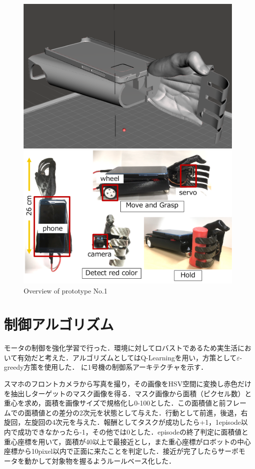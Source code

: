 \begin{figure}
    \centering
    \begin{minipage}{\linewidth}
        \centering
        \includegraphics[width=0.7\linewidth]{figure/chapter3/robothand-v1_cad}
    \end{minipage}
    \begin{minipage}{\linewidth}
        \centering
        \includegraphics[width=0.7\linewidth]{figure/chapter3/1号機外観}
    \end{minipage}
    \caption{Overview of prototype No.1}
    \label{fig:1号機外観}
\end{figure}


\section{制御アルゴリズム}
モータの制御を強化学習で行った．環境に対してロバストであるため実生活において有効だと考えた．アルゴリズムとしてはQ-Learningを用い，方策として$\varepsilon$-greedy方策を使用した．
に1号機の制御系アーキテクチャを示す．

スマホのフロントカメラから写真を撮り，その画像をHSV空間に変換し赤色だけを抽出しターゲットのマスク画像を得る．マスク画像から面積（ピクセル数）と重心を求め，面積を画像サイズで規格化し0-100とした．この面積値と前フレームでの面積値との差分の2次元を状態として与えた．行動として前進，後退，右旋回，左旋回の4次元を与えた．報酬としてタスクが成功したら+1，1episode以内で成功できなかったら-1，その他では0とした．episodeの終了判定に面積値と重心座標を用いて，面積が40以上で最接近とし，また重心座標がロボットの中心座標から10pixel以内で正面に来たことを判定した．接近が完了したらサーボモータを動かして対象物を握るようルールベース化した．



